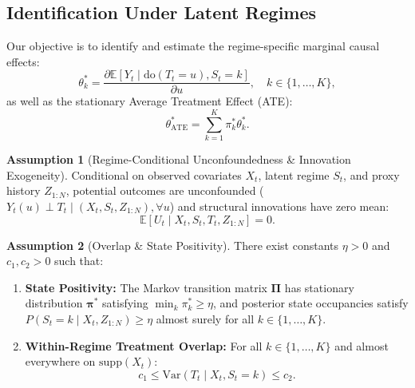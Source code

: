 \documentclass[twoside]{article}
\theoremstyle{definition}
\newtheorem{assumption}{Assumption}
\newcommand{\E}{\mathbb{E}}
\newcommand{\Var}{\mathrm{Var}}
\begin{document}
\subsection{Identification Under Latent Regimes}
Our objective is to identify and estimate the regime-specific marginal causal effects:
\begin{equation}
    \theta_k^* = \frac{\partial \E[Y_t \mid \text{do}(T_t = u), S_t = k]}{\partial u}, \quad k \in \{1, \dots, K\},
\end{equation}
as well as the stationary Average Treatment Effect (ATE):
\begin{equation}
    \theta_{\text{ATE}}^* = \sum_{k=1}^K \pi_k^* \theta_k^*.
\end{equation}

\begin{assumption}[Regime-Conditional Unconfoundedness \& Innovation Exogeneity]
\label{ass:unconfoundedness}
Conditional on observed covariates $X_t$, latent regime $S_t$, and proxy history $Z_{1:N}$, potential outcomes are unconfounded ($Y_t(u) \perp T_t \mid (X_t, S_t, Z_{1:N}), \forall u$) and structural innovations have zero mean:
\begin{equation}
    \E[U_t \mid X_t, S_t, T_t, Z_{1:N}] = 0.
\end{equation}
\end{assumption}

\begin{assumption}[Overlap \& State Positivity]
\label{ass:overlap}
\label{ass:nonsingularity}
There exist constants $\eta > 0$ and $c_1, c_2 > 0$ such that:
\begin{enumerate}\setlength{\itemsep}{0pt}\setlength{\parskip}{0pt}
    \item \textbf{State Positivity:} The Markov transition matrix $\boldsymbol{\Pi}$ has stationary distribution $\boldsymbol{\pi}^*$ satisfying $\min_{k} \pi_k^* \ge \eta$, and posterior state occupancies satisfy $P(S_t = k \mid X_t, Z_{1:N}) \ge \eta$ almost surely for all $k \in \{1, \dots, K\}$.
    \item \textbf{Within-Regime Treatment Overlap:} For all $k \in \{1, \dots, K\}$ and almost everywhere on $\mathrm{supp}(X_t)$:
    \begin{equation}
        c_1 \le \Var(T_t \mid X_t, S_t = k) \le c_2.
    \end{equation}
\end{enumerate}
\end{assumption}
\end{document}
